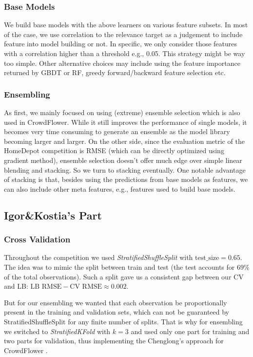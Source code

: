 \documentclass[12pt]{article}
\begin{document}
\subsubsection{Base Models}
We build base models with the above learners on various feature subsets. In most of the case, we use correlation to the relevance target as a judgement to include feature into model building or not. In specific, we only consider those features with a correlation higher than a threshold e.g., 0.05. This strategy might be way too simple. Other alternative choices may include using the feature importance returned by GBDT or RF, greedy forward/backward feature selection etc.

\subsubsection{Ensembling}
As first, we mainly focused on using (extreme) ensemble selection which is also used in CrowdFlower. While it still improves the performance of single models, it becomes very time consuming to generate an ensemble as the model library becoming larger and larger. On the other side, since the evaluation metric of the HomeDepot competition is RMSE (which can be directly optimized using gradient method), ensemble selection doesn't offer much edge over simple linear blending and stacking. So we turn to stacking eventually. One notable advantage of stacking is that, besides using the predictions from base models as features, we can also include other meta features, e.g., features used to build base models.



\subsection{Igor\&Kostia's Part}
\subsubsection{Cross Validation}

Throughout the competition we used \emph{StratifiedShuffleSplit} with $\text{test\_size}=0.65$. The idea was to mimic the split between train and test (the test accounts for $69\%$ of the total observations). Such a split gave us a consistent gap between our CV and LB: $\text{LB RMSE} - \text{CV RMSE} \approx 0.002$.

But for our ensembling we wanted that each observation be proportionally present in the training and validation sets, which can not be guaranteed by StratifiedShuffleSplit for any finite number of splits. That is why for ensembling we switched to \emph{StratifiedKFold} with $k=3$ and used only one part for training and two parts for validation, thus implementing the Chenglong's approach for CrowdFlower \cite{CrowdFlower_1st}.
\end{document}
